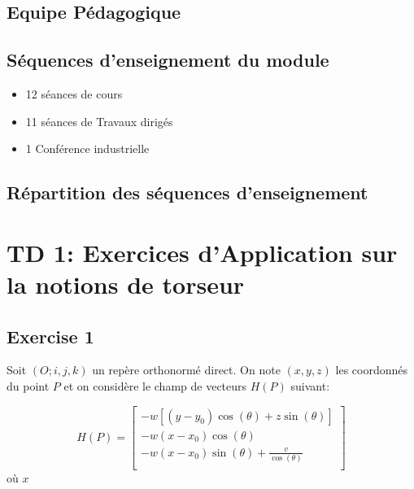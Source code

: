 \documentclass[
]{book}
\providecommand{\tightlist}{%
  \setlength{\itemsep}{0pt}\setlength{\parskip}{0pt}}
\begin{document}
\hypertarget{equipe-puxe9dagogique}{%
\section{Equipe Pédagogique}\label{equipe-puxe9dagogique}}

\hypertarget{suxe9quences-denseignement-du-module}{%
\section{Séquences d'enseignement du module}\label{suxe9quences-denseignement-du-module}}

\begin{itemize}
\tightlist
\item
  12 séances de cours
\item
  11 séances de Travaux dirigés
\item
  1 Conférence industrielle
\end{itemize}

\hypertarget{ruxe9partition-des-suxe9quences-denseignement}{%
\section{Répartition des séquences d'enseignement}\label{ruxe9partition-des-suxe9quences-denseignement}}

\hypertarget{td-1-exercices-dapplication-sur-la-notions-de-torseur}{%
\chapter{TD 1: Exercices d'Application sur la notions de torseur}\label{td-1-exercices-dapplication-sur-la-notions-de-torseur}}

\hypertarget{exercise-1}{%
\section{Exercise 1}\label{exercise-1}}

Soit \((O;i, j, k)\) un repère orthonormé direct. On note \((x, y, z)\) les coordonnés du point \(P\) et on considère le champ de vecteurs \(H(P)\) suivant:

\[
H(P) = 
\begin{bmatrix}
-w[(y - y_{0}) \cos(\theta) + z\sin(\theta) ] \\
-w(x - x_{0}) \cos(\theta) \\
-w(x - x_{0}) \sin(\theta) + \frac{v}{\cos(\theta)} \\
\end{bmatrix}
\]
où \(x\)
\end{document}
